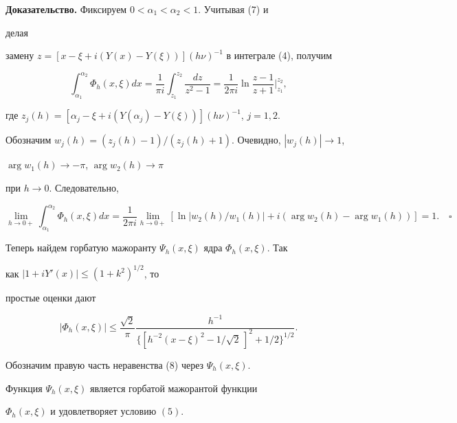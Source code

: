 {\bf Доказательство.} Фиксируем $0<\alpha_1<\alpha_2<1$. Учитывая (7) и 


делая 


замену $z=[x-\xi+i(Y(x)-Y(\xi))](h\nu)^{-1}$ в интеграле (4), получим 


$$ 


\int^{\alpha_2}_{\alpha_1}\Phi_h(x,\xi)dx=\frac{1}{\pi i} 


\int^{z_2}_{z_1}\frac{dz}{z^2-1}=\frac{1}{2\pi i} 


\ln\frac{z-1}{z+1}\bigg|^{z_2}_{z_1}, 


$$ 


где $z_j(h)=[\alpha_j-\xi+i(Y(\alpha_j)-Y(\xi))](h\nu)^{-1}$, $j=1,2$. 


 


Обозначим $w_j(h){=}(z_j(h)-1)/(z_j(h)+1)$. Очевидно, $|w_j(h)|\to1$, 


$\arg w_1(h)\to-\pi$, $\arg w_2(h)\to\pi$ 


при $h\to0$. Следовательно, 


$$ 


\lim_{h\to0+}\int^{\alpha_2}_{\alpha_1}\Phi_h(x,\xi)dx= 


\frac{1}{2\pi i}\lim_{h\to0+}[\ln|w_2(h)/w_1(h)|+ 


i(\arg w_2(h)-\arg w_1(h))]=1.\quad\square 


$$ 


 


 


Теперь найдем горбатую мажоранту $\Psi_h(x,\xi)$ ядра $\Phi_h(x,\xi)$. Так 


как $|1+iY'(x)|\le(1+k^2)^{1/2}$, то 


простые оценки дают 


\begin{equation} 


|\Phi_h(x,\xi)|\le\frac{\sqrt{2}}{\pi}\frac{h^{-1}} 


{\{[h^{-2}(x-\xi)^2-1/\sqrt{2}\,]^2+1/2\}^{1/2}}. 


\end{equation} 


 


Обозначим правую часть неравенства (8) через $\Psi_h(x,\xi)$. 


 


\begin{lem} 


Функция $\Psi_h(x,\xi)$ является горбатой мажорантой функции 


$\Phi_h(x,\xi)$ и удовлетворяет условию $(5)$. 


\end{lem} 


